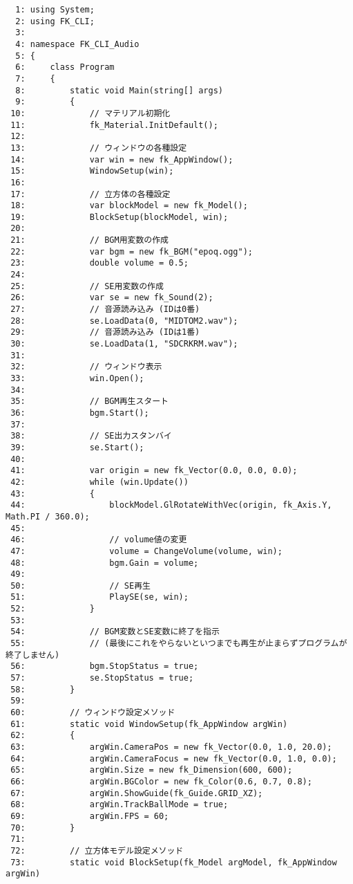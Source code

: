 \begin{breakbox}
\begin{small}
\begin{verbatim}
  1: using System;
  2: using FK_CLI;
  3: 
  4: namespace FK_CLI_Audio
  5: {
  6:     class Program
  7:     {
  8:         static void Main(string[] args)
  9:         {
 10:             // マテリアル初期化
 11:             fk_Material.InitDefault();
 12: 
 13:             // ウィンドウの各種設定
 14:             var win = new fk_AppWindow();
 15:             WindowSetup(win);
 16: 
 17:             // 立方体の各種設定
 18:             var blockModel = new fk_Model();
 19:             BlockSetup(blockModel, win);
 20: 
 21:             // BGM用変数の作成
 22:             var bgm = new fk_BGM("epoq.ogg");
 23:             double volume = 0.5;
 24: 
 25:             // SE用変数の作成
 26:             var se = new fk_Sound(2);
 27:             // 音源読み込み (IDは0番)
 28:             se.LoadData(0, "MIDTOM2.wav");
 29:             // 音源読み込み (IDは1番)
 30:             se.LoadData(1, "SDCRKRM.wav");
 31: 
 32:             // ウィンドウ表示
 33:             win.Open();
 34: 
 35:             // BGM再生スタート
 36:             bgm.Start();
 37: 
 38:             // SE出力スタンバイ
 39:             se.Start();
 40: 
 41:             var origin = new fk_Vector(0.0, 0.0, 0.0);
 42:             while (win.Update())
 43:             {
 44:                 blockModel.GlRotateWithVec(origin, fk_Axis.Y, Math.PI / 360.0);
 45: 
 46:                 // volume値の変更
 47:                 volume = ChangeVolume(volume, win);
 48:                 bgm.Gain = volume;
 49: 
 50:                 // SE再生
 51:                 PlaySE(se, win);
 52:             }
 53: 
 54:             // BGM変数とSE変数に終了を指示
 55:             // (最後にこれをやらないといつまでも再生が止まらずプログラムが終了しません)
 56:             bgm.StopStatus = true;
 57:             se.StopStatus = true;
 58:         }
 59: 
 60:         // ウィンドウ設定メソッド
 61:         static void WindowSetup(fk_AppWindow argWin)
 62:         {
 63:             argWin.CameraPos = new fk_Vector(0.0, 1.0, 20.0);
 64:             argWin.CameraFocus = new fk_Vector(0.0, 1.0, 0.0);
 65:             argWin.Size = new fk_Dimension(600, 600);
 66:             argWin.BGColor = new fk_Color(0.6, 0.7, 0.8);
 67:             argWin.ShowGuide(fk_Guide.GRID_XZ);
 68:             argWin.TrackBallMode = true;
 69:             argWin.FPS = 60;
 70:         }
 71: 
 72:         // 立方体モデル設定メソッド
 73:         static void BlockSetup(fk_Model argModel, fk_AppWindow argWin)

\end{verbatim}
\end{small}
\end{breakbox}

